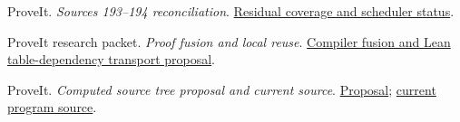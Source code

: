 \documentclass[11pt,letterpaper]{article}
\theoremstyle{definition}
\theoremstyle{remark}
\newcommand{\repo}[2]{\href{https://github.com/VladimirReshetnikov/ProveIt/blob/cbf94cb552a3b49509e0eee80e7455d4eb5974c6/#1}{#2}}
\begin{document}
\begin{thebibliography}{12}
ProveIt. \emph{Sources 193--194 reconciliation}.
\repo{SetTheory/Cardinals/docs/reports/set-theory/zfc-closure-kernels/intake-215.md}{Residual coverage and scheduler status}.

ProveIt research packet. \emph{Proof fusion and local reuse}.
\repo{Computability/BusyBeaver/Research/ZFC/k225-formal/verification/k215/simplification/proposals/proof-fusion/README.txt}{Compiler fusion and Lean table-dependency transport proposal}.

ProveIt. \emph{Computed source tree proposal and current source}.
\repo{Computability/BusyBeaver/Research/ZFC/k225-formal/verification/k215/simplification/proposals/computed-tree/README.md}{Proposal};
\repo{Computability/BusyBeaver/Lean/BusyBeaver/ZFC/KSource215Program.lean}{current program source}.
\end{thebibliography}
\end{document}
